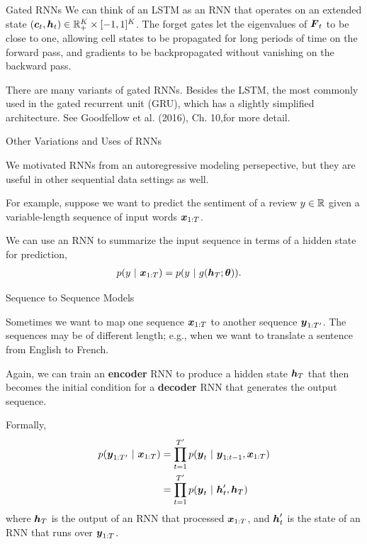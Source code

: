 \documentclass[aspectratio=169]{beamer}
\begin{document}
\begin{frame}[t,allowframebreaks]{Gated RNNs}
We can think of an LSTM as an RNN that operates on an extended state
\((\boldsymbol{c}_t, \boldsymbol{h}_t) \in \mathbb{R}_+^K \times [-1, 1]^K\). The forget gates
let the eigenvalues of \(\boldsymbol{F}_t\) to be close to one, allowing cell
states to be propagated for long periods of time on the forward pass,
and gradients to be backpropagated without vanishing on the backward
pass.

There are many variants of gated RNNs. Besides the LSTM, the most
commonly used in the gated recurrent unit (GRU), which has a slightly
simplified architecture. See Goodfellow et al. (2016), Ch. 10,for more detail.
\end{frame}

\begin{frame}[t,allowframebreaks]{Other Variations and Uses of
RNNs}\label{other-variations-and-uses-of-rnns}

We motivated RNNs from an autoregressive modeling persepective, but they
are useful in other sequential data settings as well. 

For example,
suppose we want to predict the sentiment of a review \(y \in \mathbb{R}\)
given a variable-length sequence of input words \(\boldsymbol{x}_{1:T}\). 

We can
use an RNN to summarize the input sequence in terms of a hidden state
for prediction, 
\begin{align*}
p(y ~\vert~ \boldsymbol{x}_{1:T}) &= p(y ~\vert~ g(\boldsymbol{h}_T; \boldsymbol{\theta})).
\end{align*}
\end{frame}

\begin{frame}[t,allowframebreaks]{Sequence to Sequence
Models}\label{sequence-to-sequence-models}

Sometimes we want to map one sequence \(\boldsymbol{x}_{1:T}\) to another sequence
\(\boldsymbol{y}_{1:T'}\). The sequences may be of different length; e.g., when we
want to translate a sentence from English to French. 

Again, we can train
an \textbf{encoder} RNN to produce a hidden state \(\boldsymbol{h}_T\) that then
becomes the initial condition for a \textbf{decoder} RNN that generates
the output sequence. 

Formally, 
\begin{align*} 
p(\boldsymbol{y}_{1:T'} ~\vert~ \boldsymbol{x}_{1:T}) 
&= \prod_{t=1}^{T'} p(\boldsymbol{y}_{t} ~\vert~ \boldsymbol{y}_{1:t-1}, \boldsymbol{x}_{1:T}) \\
&= \prod_{t=1}^{T'} p(\boldsymbol{y}_{t} ~\vert~ \boldsymbol{h}'_t, \boldsymbol{h}_T)
\end{align*} 
where \(\boldsymbol{h}_T\) is the output of an RNN that processed
\(\boldsymbol{x}_{1:T}\), and \(\boldsymbol{h}'_t\) is the state of an RNN that runs over
\(\boldsymbol{y}_{1:T}\).
\end{frame}
\end{document}
